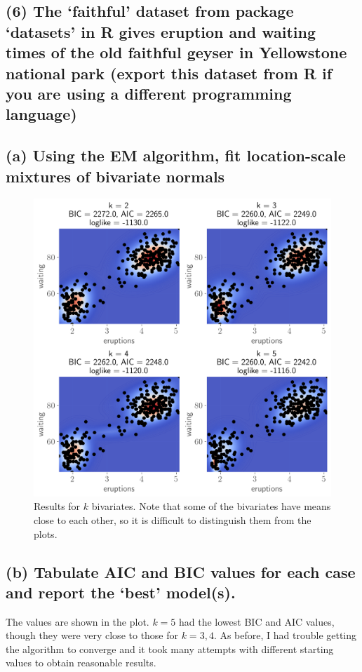 \documentclass[11pt]{article}
\begin{document}
\subsection*{(6) The ‘faithful’ dataset from package ‘datasets’ in R gives eruption and waiting times of the old faithful geyser in Yellowstone national park (export this dataset from R if you are using a different programming language)}

\subsection*{(a) Using the EM algorithm, fit location-scale mixtures of bivariate normals}
\begin{figure}[!h]
    \centering
    \includegraphics[scale=.6
    ]{homework_4/figures/bivariate.png}
    \caption{Results for $k$ bivariates. Note that some of the bivariates have means close to each other, so it is difficult to distinguish them from the plots.}
    \label{fig:my_label}
\end{figure}
\newpage
\subsection*{(b) Tabulate AIC and BIC values for each case and report the ‘best’ model(s).}
The values are shown in the plot. $k=5$ had the lowest BIC and AIC values, though they were very close to those for $k=3, 4$. As before, I had trouble getting the algorithm to converge and it took many attempts with different starting values to obtain reasonable results.
\end{document}
